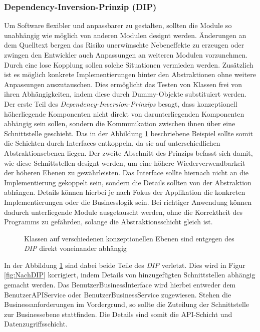 \documentclass[conference]{IEEEtran}
\begin{document}
\subsubsection{Dependency-Inversion-Prinzip (DIP)} Um Software flexibler und anpassbarer zu gestalten, sollten die Module so unabhängig wie möglich von anderen Modulen designt werden. Änderungen an dem Quelltext bergen das Risiko unerwünschte Nebeneffekte zu erzeugen oder zwingen den Entwickler auch Anpassungen an weiteren Modulen vorzunehmen. Durch eine lose Kopplung sollen solche Situationen vermieden werden. Zusätzlich ist es möglich konkrete Implementierungen hinter den Abstraktionen ohne weitere Anpassungen auszutauschen. Dies ermöglicht das Testen von Klassen frei von ihren Abhängigkeiten, indem diese durch Dummy-Objekte substituiert werden. Der erste Teil des \emph{Dependency-Inversion-Prinzips} besagt, dass konzeptionell höherliegende Komponenten nicht direkt von darunterliegenden Komponenten abhängig sein sollen, sondern die Kommunikation zwischen ihnen über eine Schnittstelle geschieht. Das in der Abbildung \ref{fig:VorDIP} beschriebene Beispiel sollte somit die Schichten durch Interfaces entkoppeln, da sie auf unterschiedlichen Abstraktionsebenen liegen. Der zweite Abschnitt des Prinzips befasst sich damit, wie diese Schnittstellen designt werden, um eine höhere Wiederverwendbarkeit der höheren Ebenen zu gewährleisten. Das Interface sollte hiernach nicht an die Implementierung gekoppelt sein, sondern die Details sollten von der Abstraktion abhängen. Details können hierbei je nach Fokus der Applikation die konkreten Implementierungen oder die Businesslogik sein. Bei richtiger Anwendung können dadurch unterliegende Module ausgetauscht werden, ohne die Korrektheit des Programms zu gefährden, solange die Abstraktionsschicht gleich ist. \cite{Martin.1996} \cite{Martin.2003} \cite{Martin.2018}

\begin{figure}[htbp]
	\small
	
	\caption{Klassen auf verschiedenen konzeptionellen Ebenen sind entgegen des \emph{DIP} direkt voneinander abhängig}
	\label{fig:VorDIP}
\end{figure}

In der Abbildung \ref{fig:VorDIP} sind dabei beide Teile des \emph{DIP} verletzt. Dies wird in Figur \ref{fig:NachDIP} korrigiert, indem Details von hinzugefügten Schnittstellen abhängig gemacht werden. Das BenutzerBusinessInterface wird hierbei entweder dem BenutzerAPIService oder BenutzerBusinessService zugewiesen. Stehen die Businessanforderungen im Vordergrund, so sollte die Zuteilung der Schnittstelle zur Businessebene stattfinden. Die Details sind somit die API-Schicht und Datenzugriffsschicht. 
\end{document}
